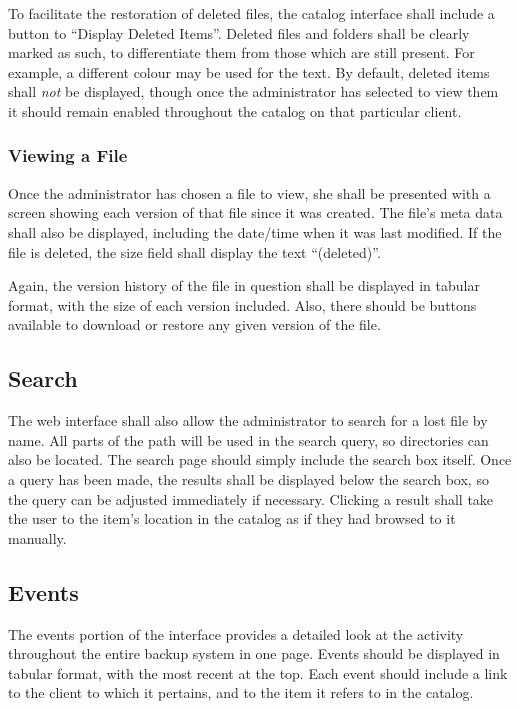 To facilitate the restoration of deleted files, the catalog interface shall
include a button to ``Display Deleted Items''. Deleted files and folders shall
be clearly marked as such, to differentiate them from those which are still
present. For example, a different colour may be used for the text. By default,
deleted items shall \emph{not} be displayed, though once the administrator has
selected to view them it should remain enabled throughout the catalog on that
particular client.

\subsubsection{Viewing a File}

Once the administrator has chosen a file to view, she shall be presented with
a screen showing each version of that file since it was created. The file's
meta data shall also be displayed, including the date/time when it was last
modified. If the file is deleted, the size field shall display the text
``(deleted)''.

Again, the version history of the file in question shall be displayed in
tabular format, with the size of each version included. Also, there should be
buttons available to download or restore any given version of the file.

\subsection{Search}

The web interface shall also allow the administrator to search for a lost file
by name. All parts of the path will be used in the search query, so directories
can also be located. The search page should simply include the search box
itself. Once a query has been made, the results shall be displayed below the
search box, so the query can be adjusted immediately if necessary. Clicking
a result shall take the user to the item's location in the catalog as if they
had browsed to it manually.

\subsection{Events}

The events portion of the interface provides a detailed look at the activity
throughout the entire backup system in one page. Events should be displayed in
tabular format, with the most recent at the top. Each event should include
a link to the client to which it pertains, and to the item it refers to in the
catalog.

